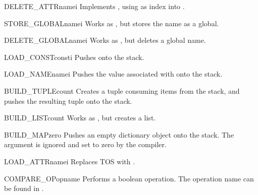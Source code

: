 \begin{opcodedesc}{DELETE_ATTR}{namei}
Implements , using  as index into
.
\end{opcodedesc}

\begin{opcodedesc}{STORE_GLOBAL}{namei}
Works as , but stores the name as a global.
\end{opcodedesc}

\begin{opcodedesc}{DELETE_GLOBAL}{namei}
Works as , but deletes a global name.
\end{opcodedesc}


\begin{opcodedesc}{LOAD_CONST}{consti}
Pushes  onto the stack.
\end{opcodedesc}

\begin{opcodedesc}{LOAD_NAME}{namei}
Pushes the value associated with  onto the stack.
\end{opcodedesc}

\begin{opcodedesc}{BUILD_TUPLE}{count}
Creates a tuple consuming  items from the stack, and pushes
the resulting tuple onto the stack.
\end{opcodedesc}

\begin{opcodedesc}{BUILD_LIST}{count}
Works as , but creates a list.
\end{opcodedesc}

\begin{opcodedesc}{BUILD_MAP}{zero}
Pushes an empty dictionary object onto the stack.  The argument is ignored
and set to zero by the compiler.
\end{opcodedesc}

\begin{opcodedesc}{LOAD_ATTR}{namei}
Replaces TOS with .
\end{opcodedesc}

\begin{opcodedesc}{COMPARE_OP}{opname}
Performs a boolean operation.  The operation name can be found
in .
\end{opcodedesc}

